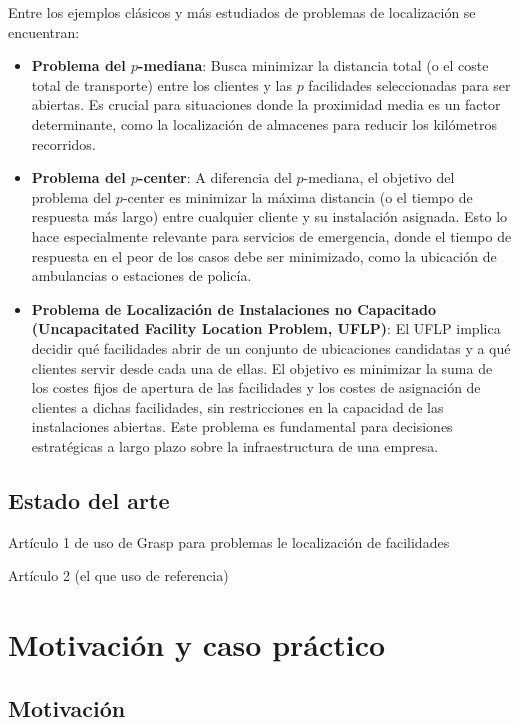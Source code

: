 \documentclass[12pt,a4paper]{book}
\begin{document}
Entre los ejemplos clásicos y más estudiados de problemas de localización se encuentran:

\begin{itemize}
    \item \textbf{Problema del $p$-mediana}: Busca minimizar la distancia total (o el coste total de transporte) entre los clientes y las $p$ facilidades seleccionadas para ser abiertas. Es crucial para situaciones donde la proximidad media es un factor determinante, como la localización de almacenes para reducir los kilómetros recorridos.

    \item \textbf{Problema del $p$-center}: A diferencia del $p$-mediana, el objetivo del problema del $p$-center es minimizar la máxima distancia (o el tiempo de respuesta más largo) entre cualquier cliente y su instalación asignada. Esto lo hace especialmente relevante para servicios de emergencia, donde el tiempo de respuesta en el peor de los casos debe ser minimizado, como la ubicación de ambulancias o estaciones de policía.

    \item \textbf{Problema de Localización de Instalaciones no Capacitado (Uncapacitated Facility Location Problem, UFLP)}: El UFLP implica decidir qué facilidades abrir de un conjunto de ubicaciones candidatas y a qué clientes servir desde cada una de ellas. El objetivo es minimizar la suma de los costes fijos de apertura de las facilidades y los costes de asignación de clientes a dichas facilidades, sin restricciones en la capacidad de las instalaciones abiertas. Este problema es fundamental para decisiones estratégicas a largo plazo sobre la infraestructura de una empresa.
\end{itemize}

\subsection{Estado del arte}

Artículo 1 de uso de Grasp para problemas le localización de facilidades

Artículo 2 (el que uso de referencia)


\section{Motivación y caso práctico}

\subsection{Motivación}
\end{document}
